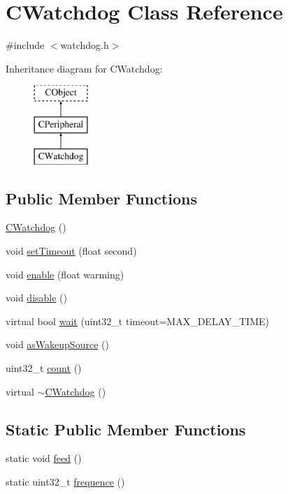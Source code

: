 \hypertarget{class_c_watchdog}{\section{C\-Watchdog Class Reference}
\label{class_c_watchdog}
}


{\ttfamily \#include $<$watchdog.\-h$>$}

Inheritance diagram for C\-Watchdog\-:\begin{figure}[H]
\begin{center}
\leavevmode
\includegraphics[height=3.000000cm]{d3/d75/class_c_watchdog}
\end{center}
\end{figure}
\subsection*{Public Member Functions}
\begin{DoxyCompactItemize}
\item 
\hyperlink{class_c_watchdog_ab2859bc21e221a86d73e1dc3877b8f86}{C\-Watchdog} ()
\item 
void \hyperlink{class_c_watchdog_af9dc7eb09403e54c36ffce01e1932f1e}{set\-Timeout} (float second)
\item 
void \hyperlink{class_c_watchdog_afbc1961aa586367e2bfaf36388bdbccb}{enable} (float warming)
\item 
void \hyperlink{class_c_watchdog_a7b59eeaca4965e03559e327131d76979}{disable} ()
\item 
virtual bool \hyperlink{class_c_watchdog_a252da476793090998b1086c99bbbd1ab}{wait} (uint32\-\_\-t timeout=M\-A\-X\-\_\-\-D\-E\-L\-A\-Y\-\_\-\-T\-I\-M\-E)
\item 
void \hyperlink{class_c_watchdog_ae0b02e76a4c9e853aec3d5526dd33963}{as\-Wakeup\-Source} ()
\item 
uint32\-\_\-t \hyperlink{class_c_watchdog_ac6c20aa855ac46780e63de1f745c4d6b}{count} ()
\item 
virtual \hyperlink{class_c_watchdog_a95284e312f91b18f52eacd6e6daeacaf}{$\sim$\-C\-Watchdog} ()
\end{DoxyCompactItemize}
\subsection*{Static Public Member Functions}
\begin{DoxyCompactItemize}
\item 
static void \hyperlink{class_c_watchdog_a34f816a6e2a53dc92943e9c309244130}{feed} ()
\item 
static uint32\-\_\-t \hyperlink{class_c_watchdog_a231300cd97144342d7d3d9606cb9b60c}{frequence} ()
\end{DoxyCompactItemize}
